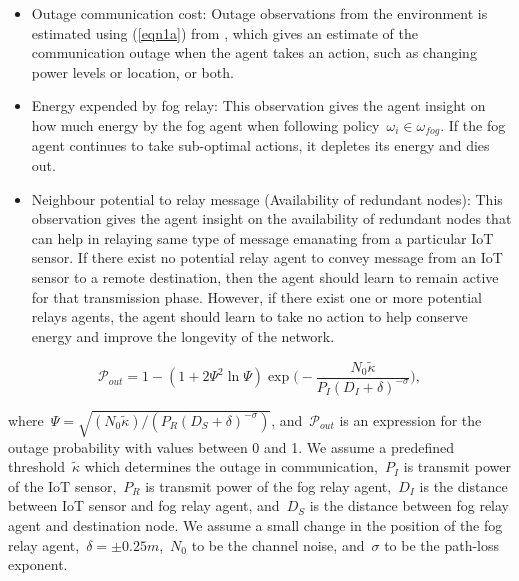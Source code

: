 \documentclass[journal]{IEEEtran}
\begin{document}
\begin{itemize}
  \item Outage communication cost: Outage observations from the environment is estimated using (\ref{eqn1a}) from \cite{OmoniwaRelay2018}, which gives an estimate of the communication outage when the agent takes an action, such as changing power levels or location, or both.
  \item Energy expended by fog relay: This observation gives the agent insight on how much energy by the fog agent when following policy~$\omega_i \in \omega_{fog}$. If the fog agent continues to take sub-optimal actions, it depletes its energy and dies out.
  \item Neighbour potential to relay message (Availability of redundant nodes): This observation gives the agent insight on the availability of redundant nodes that can help in relaying same type of message emanating from a particular IoT sensor. If there exist no potential relay agent to convey message from an IoT sensor to a remote destination, then the agent should learn to remain active for that transmission phase. However, if there exist one or more potential relays agents, the agent should learn to take no action to help conserve energy and improve the longevity of the network.
\end{itemize}


\begin{equation}\label{eqn1a}
  \mathcal{P}_{out} = 1 - (1 + 2\Psi^2 \ln \Psi) \exp\Big( -\frac{N_0 \tilde{\kappa}}{P_{I} (D_{I} + \delta)^{-\sigma}}\Big),
\end{equation}


where~$\Psi = \sqrt{(N_0 \tilde{\kappa})/(P_{R}(D_{S} + \delta)^{-\sigma})}$, and~$\mathcal{P}_{out}$ is an expression for the outage probability with values between 0 and 1. We assume a predefined threshold~$\tilde{\kappa}$ which determines the outage in communication,~$P_{I}$ is transmit power of the IoT sensor,~$P_{R}$ is transmit power of the fog relay agent,~$D_{I}$ is the distance between IoT sensor and fog relay agent, and~$D_{S}$ is the distance between fog relay agent and destination node. We assume a small change in the position of the fog relay agent,~$\delta = \pm0.25 m$,~$N_0$ to be the channel noise, and~$\sigma$ to be the path-loss exponent.
\end{document}
